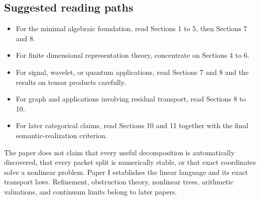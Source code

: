 \subsection*{Suggested reading paths}
\begin{itemize}
\item For the minimal algebraic foundation, read Sections 1 to 5, then Sections 7 and 8.
\item For finite dimensional representation theory, concentrate on Sections 4 to 6.
\item For signal, wavelet, or quantum applications, read Sections 7 and 8 and the results on tensor products carefully.
\item For graph and applications involving residual transport, read Sections 8 to 10.
\item For later categorical claims, read Sections 10 and 11 together with the final semantic-realization criterion.
\end{itemize}

\begin{warningbox}
The paper does not claim that every useful decomposition is automatically discovered, that every packet split is numerically stable, or that exact coordinates solve a nonlinear problem.  Paper I establishes the linear language and its exact transport laws.  Refinement, obstruction theory, nonlinear trees, arithmetic valuations, and continuum limits belong to later papers.
\end{warningbox}

